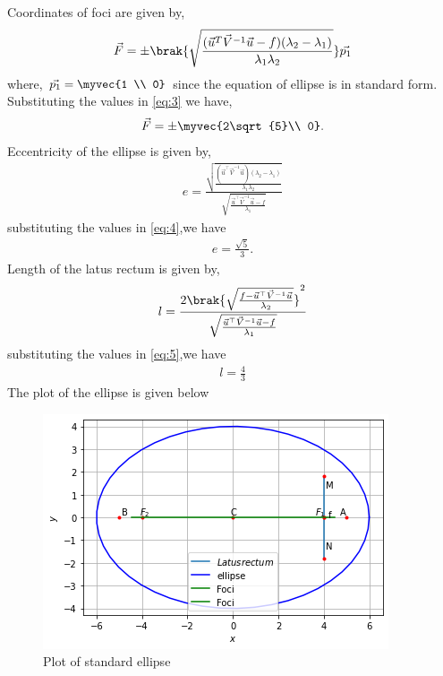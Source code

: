 \documentclass[journal,12pt,twocolumn]{IEEEtran}
\begin{document}
Coordinates of foci are given by,
\begin{align}
  \vec{F} =\pm\brak{\sqrt{\frac{(\vec{u}^T\vec{V}^{-1}\vec{u}-f)(\lambda_2-\lambda_1)}{\lambda_1\lambda_2}}}\vec{p_1} \label{eq:3}
\end{align}
where, $\vec{p_1} = \myvec{1 \\ 0}$ since the equation of ellipse is in standard form.
Substituting the values in \eqref{eq:3} we have,
\begin{align}
    \vec{F} = \pm\myvec{2\sqrt{5}\\ 0}.
\end{align}
Eccentricity of the ellipse is given by,
\begin{align}
   e = \frac{\sqrt{\frac{(\vec{u}^{\top}\vec{V}^{-1}\vec{u})(\lambda_2-\lambda_1)}{\lambda_1\lambda_2}}}{\sqrt{\frac{\vec{u}^{\top}\vec{V}^{-1}\vec{u}-f}{\lambda_1}}} \label{eq:4}
\end{align}
substituting the values in \eqref{eq:4},we have
\begin{align}
   e = \frac{\sqrt{5}}{3}.
\end{align}
Length of the latus rectum is given by,
\begin{align}
    l = \frac{2\brak{{\sqrt{\frac{f-\vec{u}^{\top}\vec{V}^{-1}\vec{u}}{\lambda_2}}}}^2}{\sqrt{\frac{\vec{u}^{\top}\vec{V}^{-1}\vec{u}-f}{\lambda_1}}} \label{eq:5}
\end{align}
substituting the values in \eqref{eq:5},we have
\begin{align}
   l = \frac{4}{3}
\end{align}
The plot of the ellipse is given below
\begin{figure}[ht]
\centering
\includegraphics[width=\columnwidth]{Ellipse.PNG}
\caption{Plot of standard ellipse}
\label{Plot of standard ellipse}
\end{figure}
\end{document}
